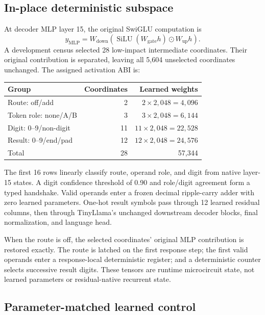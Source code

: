 \documentclass[11pt]{article}
\begin{document}
\subsection{In-place deterministic subspace}

At decoder MLP layer 15, the original SwiGLU computation is
\[
 y_{\mathrm{MLP}}
 = W_{\mathrm{down}}\left(
   \operatorname{SiLU}(W_{\mathrm{gate}}h)
   \odot W_{\mathrm{up}}h\right).
\]
A development census selected 28 low-impact intermediate coordinates. Their
original contribution is separated, leaving all 5,604 unselected coordinates
unchanged. The assigned activation ABI is:

\begin{center}
\small
\begin{tabular}{lrr}
\toprule
Group & Coordinates & Learned weights\\
\midrule
Route: off/add & 2 & $2\times2{,}048=4{,}096$\\
Token role: none/A/B & 3 & $3\times2{,}048=6{,}144$\\
Digit: 0--9/non-digit & 11 & $11\times2{,}048=22{,}528$\\
Result: 0--9/end/pad & 12 & $12\times2{,}048=24{,}576$\\
\midrule
Total & 28 & 57,344\\
\bottomrule
\end{tabular}
\end{center}

The first 16 rows linearly classify route, operand role, and digit from native
layer-15 states. A digit confidence threshold of 0.90 and role/digit agreement
form a typed handshake. Valid operands enter a frozen decimal ripple-carry
adder with zero learned parameters. One-hot result symbols pass through 12
learned residual columns, then through TinyLlama's unchanged downstream
decoder blocks, final normalization, and language head.

When the route is off, the selected coordinates' original MLP contribution is
restored exactly. The route is latched on the first response step; the first
valid operands enter a response-local deterministic register; and a
deterministic counter selects successive result digits. These tensors are
runtime microcircuit state, not learned parameters or residual-native recurrent
state.

\subsection{Parameter-matched learned control}
\end{document}
